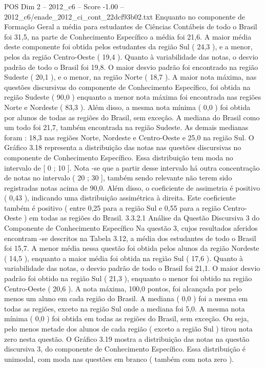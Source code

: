 \begin{textsample}{POS Dim 2 – 2012\_c6 – Score -1.00 – 2012\_c6/enade\_2012\_ci\_cont\_22dcf93b02.txt}
Enquanto no componente de Formação Geral a média para estudantes de Ciências Contábeis de todo o Brasil foi 31,5, na parte de Conhecimento Específico a média foi 21,6.
A maior média deste componente foi obtida pelos estudantes da região Sul ( 24,3 ), e a menor, pelos da região Centro-Oeste ( 19,4 ).
Quanto à variabilidade das notas, o desvio padrão de todo o Brasil foi 19,8.
O maior desvio padrão foi encontrado na região Sudeste ( 20,1 ), e o menor, na região Norte ( 18,7 ).
A maior nota máxima, nas questões discursivas do componente de Conhecimento Específico, foi obtida na região Sudeste ( 90,0 ) enquanto a menor nota máxima foi encontrada nas regiões Norte e Nordeste ( 83,3 ).
Além disso, a mesma nota mínima ( 0,0 ) foi obtida por alunos de todas as regiões do Brasil, sem exceção.
A mediana do Brasil como um todo foi 21,7, também encontrada na região Sudeste.
As demais medianas foram : 18,3 nas regiões Norte, Nordeste e Centro-Oeste e 25,0 na região Sul.
O Gráfico 3.18 representa a distribuição das notas nas questões discursivas no componente de Conhecimento Específico.
Essa distribuição tem moda no intervalo de [ 0 ; 10 ].
Nota -se que a partir desse intervalo há outra concentração de notas no intervalo ( 20 ; 30 ], também sendo relevante não terem sido registradas notas acima de 90,0.
Além disso, o coeficiente de assimetria é positivo ( 0,43 ), indicando uma distribuição assimétrica à direita.
Este coeficiente também é positivo ( entre 0,25 para a região Sul e 0,55 para a região Centro-Oeste ) em todas as regiões do Brasil. 3.3.2.1 Análise da Questão Discursiva 3 do Componente de Conhecimento Específico Na questão 3, cujos resultados aferidos encontram -se descritos na Tabela 3.12, a média dos estudantes de todo o Brasil foi 15,7.
A menor média nessa questão foi obtida pelos alunos da região Nordeste ( 14,5 ), enquanto a maior média foi obtida na região Sul ( 17,6 ).
Quanto à variabilidade das notas, o desvio padrão de todo o Brasil foi 21,1.
O maior desvio padrão foi obtido na região Sul ( 21,3 ), enquanto o menor foi obtido na região Centro-Oeste ( 20,6 ).
A nota máxima, 100,0 pontos, foi alcançada por pelo menos um aluno em cada região do Brasil.
A mediana ( 0,0 ) foi a mesma em todas as regiões, exceto na região Sul onde a mediana foi 5,0.
A mesma nota mínima ( 0,0 ) foi obtida em todas as regiões do Brasil, sem exceção.
Ou seja, pelo menos metade dos alunos de cada região ( exceto a região Sul ) tirou nota zero nesta questão.
O Gráfico 3.19 mostra a distribuição das notas na questão discursiva 3, do componente de Conhecimento Específico.
Essa distribuição é unimodal, com moda nas questões em branco ( também com nota zero ).

\end{textsample}
